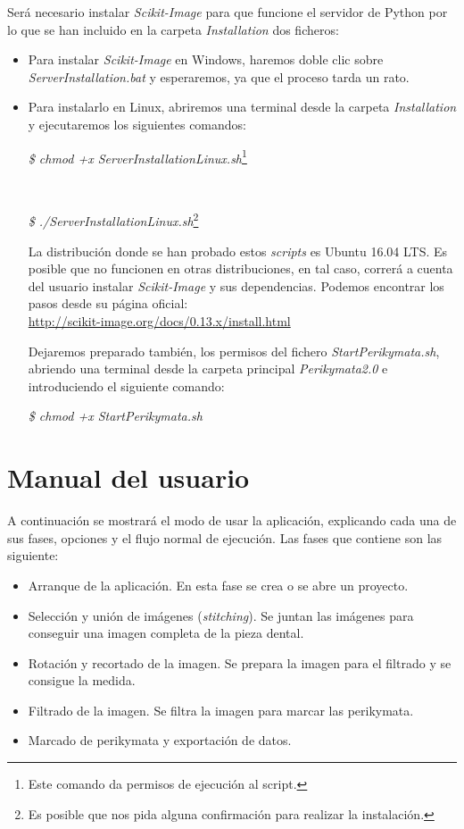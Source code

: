 Será necesario instalar \textit{Scikit-Image} para que funcione el servidor de Python por lo que se han incluido en la carpeta \textit{Installation} dos ficheros:
\begin{itemize}
    \item Para instalar \textit{Scikit-Image} en Windows, haremos doble clic sobre \textit{ServerInstallation.bat} y esperaremos, ya que el proceso tarda un rato.
    \item Para instalarlo en Linux, abriremos una terminal desde la carpeta \textit{Installation} y ejecutaremos los siguientes comandos:
    
    \centerline{\textit{\$ chmod +x ServerInstallationLinux.sh}\footnote{Este comando da permisos de ejecución al script.}}
    \\ \centerline{\textit{\$ ./ServerInstallationLinux.sh}\footnote{Es posible que nos pida alguna confirmación para realizar la instalación.}}
    
    La distribución donde se han probado estos \textit{scripts} es Ubuntu 16.04 LTS. Es posible que no funcionen en otras distribuciones, en tal caso, correrá a cuenta del usuario instalar \textit{Scikit-Image} y sus dependencias. Podemos encontrar los pasos desde su página oficial: \\ \url{http://scikit-image.org/docs/0.13.x/install.html}
    
    Dejaremos preparado también, los permisos del fichero \textit{StartPerikymata.sh}, abriendo una terminal desde la carpeta principal \textit{Perikymata2.0} e introduciendo el siguiente comando: \\
    \centerline{\textit{\$ chmod +x StartPerikymata.sh}}
\end{itemize}

\newpage
\section{Manual del usuario}

A continuación se mostrará el modo de usar la aplicación, explicando cada una de sus fases, opciones y el flujo normal de ejecución. Las fases que contiene son las siguiente:
\begin{itemize}
    \item Arranque de la aplicación. En esta fase se crea o se abre un proyecto.
    \item Selección y unión de imágenes (\textit{stitching}). Se juntan las imágenes para conseguir una imagen completa de la pieza dental.
    \item Rotación y recortado de la imagen. Se prepara la imagen para el filtrado y se consigue la medida.
    \item Filtrado de la imagen. Se filtra la imagen para marcar las perikymata.
    \item Marcado de perikymata y exportación de datos.
\end{itemize}

